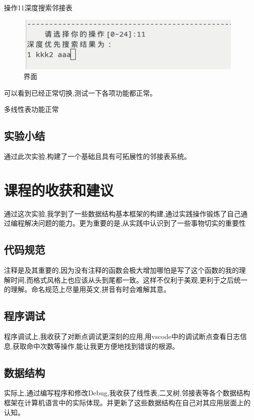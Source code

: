\documentclass[supercite]{Experimental_Report}
\theoremstyle{definition}
\begin{document}
操作11深度搜索邻接表

\begin{figure}[!htb]
	\begin{center}
		\includegraphics[scale=0.60]{images/2-36.png}
		\caption{界面}
		\label{fig2-36}
		\end{center}
\end{figure}

可以看到已经正常切换,测试一下各项功能都正常。

多线性表功能正常

\subsection{实验小结}

通过此次实验,构建了一个基础且具有可拓展性的邻接表系统。

\newpage

\section{课程的收获和建议}

通过这次实验,我学到了一些数据结构基本框架的构建,通过实践操作锻炼了自己通过编程解决问题的能力。更为重要的是,从实践中认识到了一些事物切实的重要性

\subsection{代码规范}

注释是及其重要的,因为没有注释的函数会极大增加哪怕是写了这个函数的我的理解时间,而格式风格上也应该从头到尾都一致。这样不仅利于美观,更利于之后统一的理解。命名规范上尽量用英文,拼音有时会难解其意。

\subsection{程序调试}

程序调试上,我收获了对断点调试更深刻的应用,用vscode中的调试断点查看日志信息,获取命中次数等操作,能让我更方便地找到错误的根源。

\subsection{数据结构}

实际上,通过编写程序和修改Debug,我收获了线性表,二叉树,邻接表等各个数据结构框架在计算机语言中的实际体现。并更新了这些数据结构在自己对其应用层面上的认知。




\setcounter{secnumdepth}{0}
\appendix
\end{document}
